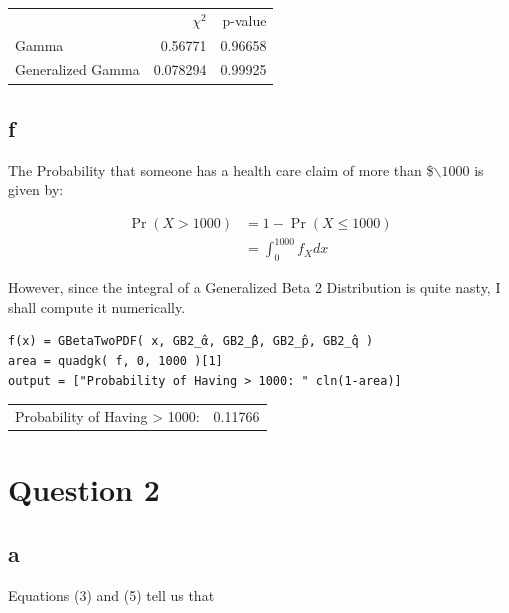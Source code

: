 \documentclass[12pt, letterpaper]{paper}
\begin{document}
\begin{center}
\begin{tabular}{lrr}
 & \(\chi^{2}\) & p-value\\
Gamma & 0.56771 & 0.96658\\
Generalized Gamma & 0.078294 & 0.99925\\
\end{tabular}
\end{center}

\subsection{f}
\label{sec:org638d3ea}
The Probability that someone has a health care claim of more than
\$$\backslash$\(1000\) is given by:

\begin{align*}
  \Pr( X > 1000) &= 1 - \Pr( X \leq 1000)\\
                 &= \int_0^{1000}f_Xdx
\end{align*}

However, since the integral of a Generalized Beta 2 Distribution is
quite nasty, I shall compute it numerically.

\begin{verbatim}
f(x) = GBetaTwoPDF( x, GB2_̂α, GB2_̂β, GB2_̂p, GB2_̂q )
area = quadgk( f, 0, 1000 )[1]
output = ["Probability of Having > 1000: " cln(1-area)]
\end{verbatim}

\begin{center}
\begin{tabular}{lr}
Probability of Having > 1000: & 0.11766\\
\end{tabular}
\end{center}



\section{Question 2}
\label{sec:org36206b2}

\subsection{a}
\label{sec:org3a3570a}

Equations (3) and (5) tell us that
\end{document}
